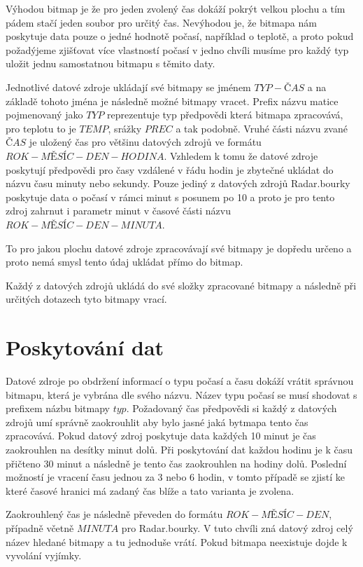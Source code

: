 \documentclass[czech,bachelor,dept460,male,csharp,cpdeclaration]{diploma}
\begin{document}
	Výhodou bitmap je že pro jeden zvolený čas dokáží pokrýt velkou plochu a tím pádem stačí jeden soubor pro určitý čas. Nevýhodou je, že bitmapa nám poskytuje data pouze o jedné hodnotě počasí, například o teplotě, a proto pokud požadýjeme zjišťovat více vlastností počasí v jedno chvíli musíme pro každý typ uložit jednu samostatnou bitmapu s těmito daty.
	
	Jednotlivé datové zdroje ukládají své bitmapy se jménem $TYP-ČAS$ a na základě tohoto jména je následně možné bitmapy vracet. Prefix názvu matice pojmenovaný jako $TYP$ reprezentuje typ předpovědi která bitmapa zpracovává, pro teplotu to je $TEMP$, srážky $PREC$ a tak podobně. Vruhé části názvu zvané $ČAS$ je uložený čas pro většinu datových zdrojů ve formátu $ROK-MĚSÍC-DEN-HODINA$. Vzhledem k tomu že datové zdroje poskytují předpovědi pro časy vzdálené v řádu hodin je zbytečné ukládat do názvu času minuty nebo sekundy. Pouze jediný z datových zdrojů Radar.bourky poskytuje data o počasí v rámci minut s posunem po 10 a proto je pro tento zdroj zahrnut i parametr minut v časové části názvu $ROK-MĚSÍC-DEN-MINUTA$.
	
	To pro jakou plochu datové zdroje zpracovávají své bitmapy je dopředu určeno a proto nemá smysl tento údaj ukládat přímo do bitmap.
	
	Každý z datových zdrojů ukládá do své složky zpracované bitmapy a následně při určitých dotazech tyto bitmapy vrací. 
	
	\section{Poskytování dat}
	
	Datové zdroje po obdržení informací o typu počasí a času dokáží vrátit správnou bitmapu, která je vybrána dle svého názvu. Název typu počasí se musí shodovat s prefixem názbu bitmapy $typ$. Požadovaný čas předpovědi si každý z datových zdrojů umí správně zaokrouhlit aby bylo jasné jaká bytmapa tento čas zpracovává. Pokud datový zdroj poskytuje data každých 10 minut je čas zaokrouhlen na desítky minut dolů. Při poskytování dat každou hodinu je k času přičteno 30 minut a následně je tento čas zaokrouhlen na hodiny dolů. Poslední možností je vracení času jednou za 3 nebo 6 hodin, v tomto případě se zjistí ke které časové hranici má zadaný čas blíže a tato varianta je zvolena.
	
	Zaokrouhlený čas je následně převeden do formátu $ROK-MĚSÍC-DEN$, případně včetně $MINUTA$ pro Radar.bourky. V tuto chvíli zná datový zdroj celý název hledané bitmapy a tu jednoduše vrátí. Pokud bitmapa neexistuje dojde k vyvolání vyjímky.
	
\end{document}
